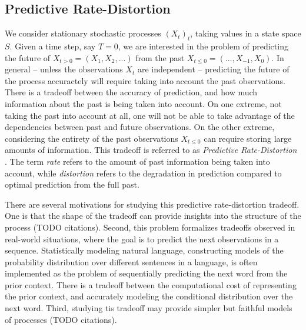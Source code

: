 \documentclass[11pt,letterpaper]{article}
\begin{document}
\subsection{Predictive Rate-Distortion}


We consider stationary stochastic processes $(X_t)_t$, taking values in a state space $S$.
Given a time step, say $T=0$, we are interested in the problem of predicting the future of $X_{t>0} = (X_1, X_2, ...)$ from the past $X_{t\leq 0} = (..., X_{-1}, X_0)$.
In general -- unless the observations $X_t$ are independent -- predicting the future of the process accuractely will require taking into account the past observations.
There is a tradeoff between the accuracy of prediction, and how much information about the past is being taken into account.
On one extreme, not taking the past into account at all, one will not be able to take advantage of the dependencies between past and future observations.
On the other extreme, considering the entirety of the past observations $X_{t \leq 0}$ can require storing large amounts of information.
This tradeoff is referred to as \emph{Predictive Rate-Distortion} \citep{marzen-predictive-2016}.
The term \emph{rate} refers to the amount of past information being taken into account, while \emph{distortion} refers to the degradation in prediction compared to optimal prediction from the full past.


There are several motivations for studying this predictive rate-distortion tradeoff.
One is that the shape of the tradeoff can provide insights into the structure of the process (TODO citations).
Second, this problem formalizes tradeoffs observed in real-world situations, where the goal is to predict the next observations in a sequence.
Statistically modeling natural language, constructing models of the probability distribution over different sentences in a language, is often implemented as the problem of sequentially predicting the next word from the prior context.
There is a tradeoff between the computational cost of representing the prior context, and accurately modeling the conditional distribution over the next word.
Third, studying tis tradeoff may provide simpler but faithful models of processes (TODO citations).
\end{document}
